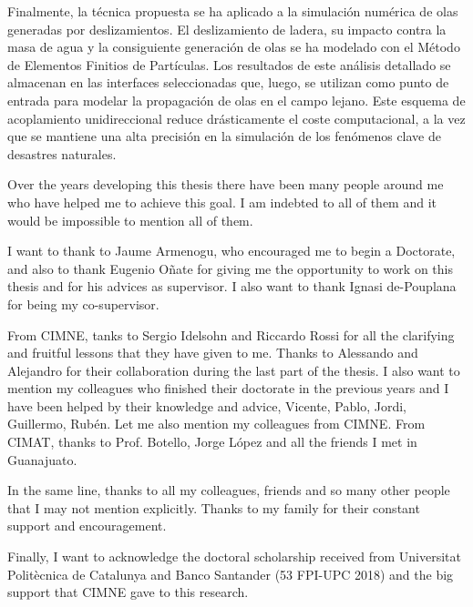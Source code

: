 \documentclass[
11pt,                   %
english,                %
singlespacing,          %
headsepline,            %
]{MastersDoctoralThesis}
\begin{document}
\begin{resumen}
Finalmente, la técnica propuesta se ha aplicado a la simulación numérica de olas generadas por deslizamientos. El deslizamiento de ladera, su impacto contra la masa de agua y la consiguiente generación de olas se ha modelado con el Método de Elementos Finitios de Partículas. Los resultados de este análisis detallado se almacenan en las interfaces seleccionadas que, luego, se utilizan como punto de entrada para modelar la propagación de olas en el campo lejano.
Este esquema de acoplamiento unidireccional reduce drásticamente el coste computacional, a la vez que se mantiene una alta precisión en la simulación de los fenómenos clave de desastres naturales.
\end{resumen}



\begin{acknowledgements}
Over the years developing this thesis there have been many people around me who have helped me to achieve this goal. 
I am indebted to all of them and it would be impossible to mention all of them.

I want to thank to Jaume Armenogu, who encouraged me to begin a Doctorate, and also to thank Eugenio Oñate for giving me the opportunity to work on this thesis and for his advices as supervisor. I also want to thank Ignasi de-Pouplana for being my co-supervisor.

From CIMNE, tanks to Sergio Idelsohn and Riccardo Rossi for all the clarifying and fruitful lessons that they have given to me. Thanks to Alessando and Alejandro for their collaboration during the last part of the thesis. I also want to mention my colleagues who finished their doctorate in the previous years and I have been helped by their knowledge and advice, Vicente, Pablo, Jordi, Guillermo, Rubén. Let me also mention my colleagues from CIMNE. From CIMAT, thanks to Prof. Botello, Jorge López and all the friends I met in Guanajuato.

In the same line, thanks to all my colleagues, friends and so many other people that I may
not mention explicitly. Thanks to my family for their constant support and encouragement.

Finally, I want to acknowledge the doctoral scholarship received from Universitat Politècnica de Catalunya and Banco Santander (53 FPI-UPC 2018) and the big support that CIMNE gave to this research.
\end{acknowledgements}
\end{document}

